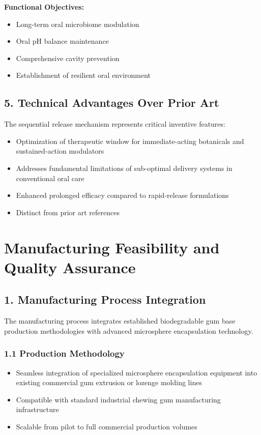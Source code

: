 \documentclass[12pt]{article}
\begin{document}
\textbf{Functional Objectives:}
\begin{itemize}
    \item Long-term oral microbiome modulation
    \item Oral pH balance maintenance
    \item Comprehensive cavity prevention
    \item Establishment of resilient oral environment
\end{itemize}

\subsection*{5. Technical Advantages Over Prior Art}
The sequential release mechanism represents critical inventive features:

\begin{itemize}
    \item Optimization of therapeutic window for immediate-acting botanicals and sustained-action modulators
    \item Addresses fundamental limitations of sub-optimal delivery systems in conventional oral care
    \item Enhanced prolonged efficacy compared to rapid-release formulations
    \item Distinct from prior art references 
\end{itemize}

\section*{Manufacturing Feasibility and Quality Assurance}

\subsection*{1. Manufacturing Process Integration}
The manufacturing process integrates established biodegradable gum base production methodologies with advanced microsphere encapsulation technology.

\subsubsection*{1.1 Production Methodology}
\begin{itemize}
    \item Seamless integration of specialized microsphere encapsulation equipment into existing commercial gum extrusion or lozenge molding lines
    \item Compatible with standard industrial chewing gum manufacturing infrastructure
    \item Scalable from pilot to full commercial production volumes
\end{itemize}
\end{document}
